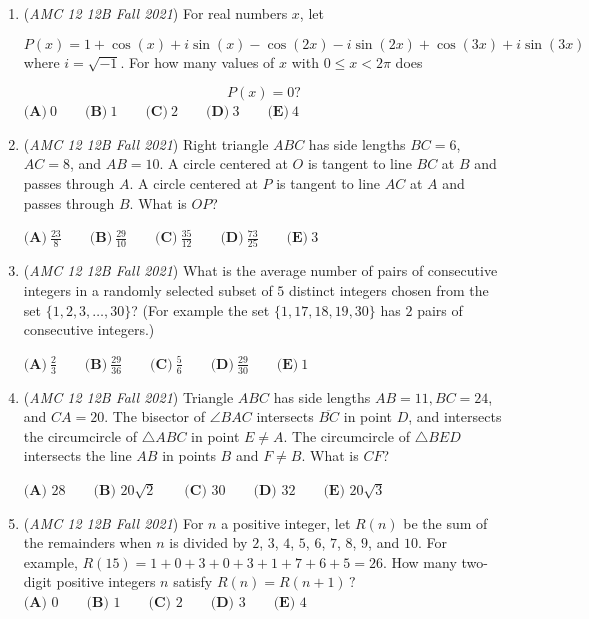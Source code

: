 \begin{enumerate}
 $(\textbf{A})\: 7\qquad(\textbf{B}) \: 8\qquad(\textbf{C}) \: 9\qquad(\textbf{D}) \: 10\qquad(\textbf{E}) \: 11$


	\item (\textit{AMC 12 12B Fall 2021}) For real numbers $x$, let 

 \[P(x)=1+\cos(x)+i\sin(x)-\cos(2x)-i\sin(2x)+\cos(3x)+i\sin(3x)\]
where $i = \sqrt{-1}$. For how many values of $x$ with $0\leq x<2\pi$ does 

 \[P(x)=0?\]
$\textbf{(A)}\ 0 \qquad\textbf{(B)}\  1 \qquad\textbf{(C)}\  2 \qquad\textbf{(D)}\ 3 \qquad\textbf{(E)}\ 4$


	\item (\textit{AMC 12 12B Fall 2021}) Right triangle $ABC$ has side lengths $BC=6$, $AC=8$, and $AB=10$. A circle centered at $O$ is tangent to line $BC$ at $B$ and passes through $A$. A circle centered at $P$ is tangent to line $AC$ at $A$ and passes through $B$. What is $OP$?


 $\textbf{(A)}\ \frac{23}{8} \qquad\textbf{(B)}\  \frac{29}{10} \qquad\textbf{(C)}\  \frac{35}{12} \qquad\textbf{(D)}\ \frac{73}{25} \qquad\textbf{(E)}\ 3$


	\item (\textit{AMC 12 12B Fall 2021}) What is the average number of pairs of consecutive integers in a randomly selected subset of $5$ distinct integers chosen from the set $\{ 1, 2, 3, \ldots, 30\}$? (For example the set $\{1, 17, 18, 19, 30\}$ has $2$ pairs of consecutive integers.)


 $\textbf{(A)}\ \frac{2}{3} \qquad\textbf{(B)}\ \frac{29}{36} \qquad\textbf{(C)}\ \frac{5}{6} \qquad\textbf{(D)}\ \frac{29}{30} \qquad\textbf{(E)}\ 1$


	\item (\textit{AMC 12 12B Fall 2021}) Triangle $ABC$ has side lengths $AB = 11, BC=24$, and $CA = 20$. The bisector of $\angle{BAC}$ intersects $\overline{BC}$ in point $D$, and intersects the circumcircle of $\triangle{ABC}$ in point $E \ne A$. The circumcircle of $\triangle{BED}$ intersects the line $AB$ in points $B$ and $F \ne B$. What is $CF$?


 $\textbf{(A) } 28 \qquad \textbf{(B) } 20\sqrt{2} \qquad \textbf{(C) } 30 \qquad \textbf{(D) } 32 \qquad \textbf{(E) } 20\sqrt{3}$


	\item (\textit{AMC 12 12B Fall 2021}) For $n$ a positive integer, let $R(n)$ be the sum of the remainders when $n$ is divided by $2$, $3$, $4$, $5$, $6$, $7$, $8$, $9$, and $10$. For example, $R(15) = 1+0+3+0+3+1+7+6+5=26$. How many two-digit positive integers $n$ satisfy $R(n) = R(n+1)\,?$
$\textbf{(A) }0\qquad\textbf{(B) }1\qquad\textbf{(C) }2\qquad\textbf{(D) }3\qquad\textbf{(E) }4$


\end{enumerate}